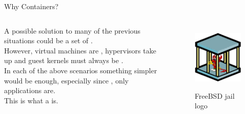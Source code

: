 \begin{frame}{Why Containers?}
\begin{columns}
  A possible solution to many of the previous situations could be a set of .\\
  However, virtual machines are , hypervisors take up  and guest kernels must always be .\\
  In each of the above scenarios something simpler would be enough, especially since , only applications are.\\
  This is what a  is.

  \begin{figure}
    \centering
    \includegraphics[scale=.7]{freebsdjail.png}
    \label{fig:jail}
    \caption{FreeBSD jail logo}
  \end{figure}
\end{columns}
\end{frame}

